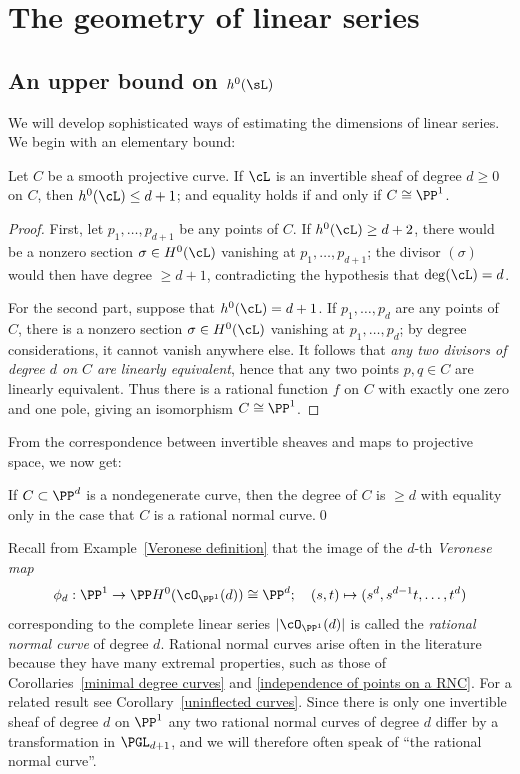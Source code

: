 \section{The geometry of linear series}

\subsection{An upper bound on $h^0(\sL)$}

We will develop sophisticated ways of estimating the dimensions of linear series. We begin with an elementary bound:

\begin{theorem}\label{characterization of P1}
Let $C$ be a smooth projective curve. If $\cL$ is an invertible sheaf of degree $d\geq 0$ on $C$, then $h^0(\cL)\leq d+1$; and
equality holds if and only if $C \cong \PP^1$.
\end{theorem}

\begin{proof}
First, let $p_1,\dots,p_{d+1}$ be any points of $C$. If $h^0(\cL)\geq d+2$, there would be a nonzero section $\sigma \in H^0(\cL)$ vanishing at $p_1,\dots,p_{d+1}$; the divisor $(\sigma)$ would then have degree $\geq d+1$, contradicting the hypothesis that $\deg(\cL) = d$.

For the second part, suppose that $h^0(\cL) = d+1$. If $p_1,\dots,p_{d}$ are any points of $C$, there is a nonzero section $\sigma \in H^0(\cL)$ vanishing at $p_1,\dots,p_{d}$; by degree considerations, it cannot vanish anywhere else. It follows that \emph{any two divisors of degree $d$ on $C$ are linearly equivalent}, hence that any two points $p,q \in C$ are linearly equivalent. Thus there is a rational function $f$ on $C$ with exactly one zero and one pole, giving an isomorphism $C \cong \PP^1$.
 \end{proof}

From the correspondence between invertible sheaves and maps to projective space, we now get:
\begin{corollary}\label{minimal degree curves}
If $C\subset \PP^d$ is a  nondegenerate curve, then the degree of $C$ is $\geq d$ with equality only in the case
that $C$ is a rational normal curve.\qed
\end{corollary}

Recall from Example~\ref{Veronese definition} that the image of the $d$-th \emph{Veronese map}  
$$
\phi_d: \PP^1 \to \PP H^0(\cO_{\PP^1}(d)) \cong \PP^d; \quad (s,t) \mapsto (s^d, s^{d-1}t, \dots, t^d)
$$
corresponding to the complete linear series $|\cO_{\PP^1}(d)|$ is called the \emph{rational normal curve} of degree $d$. Rational normal curves arise often in the literature because they have many extremal properties, such as those of Corollaries~\ref{minimal degree curves} and \ref{independence of points on a RNC}. For a related result see Corollary~\ref{uninflected curves}. Since there is only
one invertible sheaf of degree $d$ on $\PP^1$ any two rational normal curves of degree $d$ differ by a transformation in $\PGL_{d+1}$,
and we will therefore often speak of ``the rational normal curve''.

